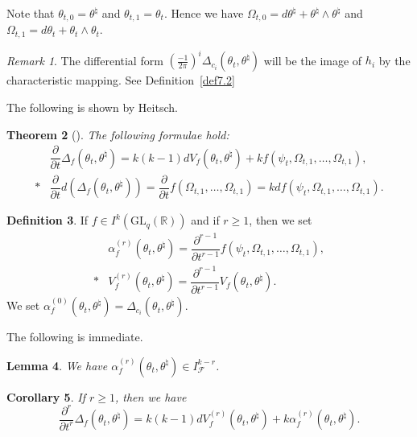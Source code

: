 \documentclass[12pt]{amsart}
\newcommand{\CF}{{\mathcal F}}
\newcommand{\R}{{\mathbb R}}
\newcommand{\GL}{\mathrm{GL}}
\newcommand{\pdif}[2]{\dfrac{\partial#1}{\partial#2}}
\newtheorem{theorem}{Theorem}[section]
\newtheorem{corollary}[theorem]{Corollary}
\newtheorem{lemma}[theorem]{Lemma}
\theoremstyle{definition}
\newtheorem{definition}[theorem]{Definition}
\theoremstyle{remark}
\newtheorem{remark}[theorem]{Remark}
\begin{document}
Note that $\theta_{t,0}=\theta^\natural$ and $\theta_{t,1}=\theta_t$.
Hence we have $\Omega_{t,0}=d\theta^\natural+\theta^\natural\wedge\theta^\natural$ and $\Omega_{t,1}=d\theta_t+\theta_t\wedge\theta_t$.

\begin{remark}
The differential form $\left(\frac{-1}{2\pi}\right)^i\Delta_{c_i}(\theta_t,\theta^\natural)$ will be the image of $h_i$ by the characteristic mapping.
See Definition~\ref{def7.2}
\end{remark}

The following is shown by Heitsch.

\begin{theorem}[\cite{Heitsch:Topology}]
\label{thm6.9}
The following formulae hold\textup{:}
\begin{align*}
&\pdif{}{t}\Delta_f(\theta_t,\theta^\natural)=k(k-1)dV_f(\theta_t,\theta^\natural)+kf(\psi_t,\Omega_{t,1},\ldots,\Omega_{t,1}),\\*
&\pdif{}{t}d(\Delta_f(\theta_t,\theta^\natural))=\pdif{}{t}f(\Omega_{t,1},\ldots,\Omega_{t,1})=kdf(\psi_t,\Omega_{t,1},\ldots,\Omega_{t,1}).
\end{align*}
\end{theorem}

\begin{definition}
If $f\in I^k(\GL_q(\R))$ and if $r\geq1$, then we set
\begin{align*}
&\alpha^{(r)}_f(\theta_t,\theta^\natural)=\dfrac{\partial^{r-1}}{\partial t^{r-1}}f(\psi_t,\Omega_{t,1},\ldots,\Omega_{t,1}),\\*
&V^{(r)}_f(\theta_t,\theta^\natural)=\dfrac{\partial^{r-1}}{\partial t^{r-1}}V_f(\theta_t,\theta^\natural).
\end{align*}
We set $\alpha^{(0)}_f(\theta_t,\theta^\natural)=\Delta_{c_i}(\theta_t,\theta^\natural)$.
\end{definition}

The following is immediate.

\begin{lemma}
\label{lem6.11}
We have $\alpha^{(r)}_f(\theta_t,\theta^\natural)\in I_\CF^{k-r}$.
\end{lemma}

\begin{corollary}
If $r\geq1$, then we have
\[
\dfrac{\partial^r}{\partial t^r}\Delta_f(\theta_t,\theta^\natural)=k(k-1)dV^{(r)}_f(\theta_t,\theta^\natural)+k\alpha_f^{(r)}(\theta_t,\theta^\natural).
\]
\end{corollary}
\end{document}
